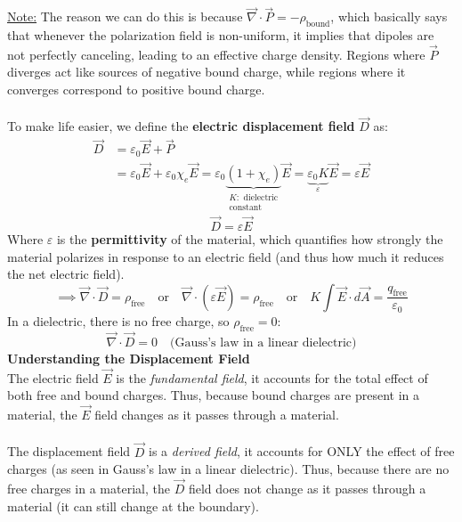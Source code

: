 \documentclass[12pt]{article}
\begin{document}
\underline{Note:} The reason we can do this is because $\vec{\nabla}\cdot\vec{P} = -\rho_\text{bound}$, which basically says that whenever the polarization field is non-uniform, it implies that dipoles are not perfectly canceling, leading to an effective charge density. Regions where $\vec{P}$ diverges act like sources of negative bound charge, while regions where it converges correspond to positive bound charge.\\\\
To make life easier, we define the \textbf{electric displacement field} $\vec{D}$ as:
\[\begin{aligned}
    \vec{D} &= \varepsilon_0 \vec{E} + \vec{P} \\
     &= \varepsilon_0 \vec{E} + \varepsilon_0 \chi_e \vec{E} = \varepsilon_0 \underbrace{(1 + \chi_e)}_{\substack{K: \text{ dielectric} \\ \text{constant}}} \vec{E} = \underbrace{\varepsilon_0 K}_{\varepsilon} \vec{E} = \varepsilon \vec{E}
\end{aligned}\]
\[\boxed{\vec{D} = \varepsilon \vec{E}}\]
Where $\varepsilon$ is the \textbf{permittivity} of the material, which quantifies how strongly the material polarizes in response to an electric field (and thus how much it reduces the net electric field).
\[\implies \vec{\nabla}\cdot\vec{D} = \rho_\text{free} \quad \text{or}\quad \vec{\nabla}\cdot(\varepsilon \vec{E}) = \rho_\text{free} \quad\text{or}\quad K\int \vec{E}\cdot d\vec{A} = \frac{q_\text{free}}{\varepsilon_0}\]
In a dielectric, there is no free charge, so $\rho_\text{free} = 0$: 
\[\boxed{\vec{\nabla}\cdot\vec{D} = 0 \quad \text{(Gauss's law in a linear dielectric)}}\]
\textbf{Understanding the Displacement Field}\\
The electric field $\vec{E}$ is the \textit{fundamental field}, it accounts for the total effect of both free and bound charges. Thus, because bound charges are present in a material, the $\vec{E}$ field changes as it passes through a material.\\\\
The displacement field $\vec{D}$ is a \textit{derived field}, it accounts for ONLY the effect of free charges (as seen in Gauss's law in a linear dielectric). Thus, because there are no free charges in a material, the $\vec{D}$ field does not change as it passes through a material (it can still change at the boundary).
\newpage
\end{document}
